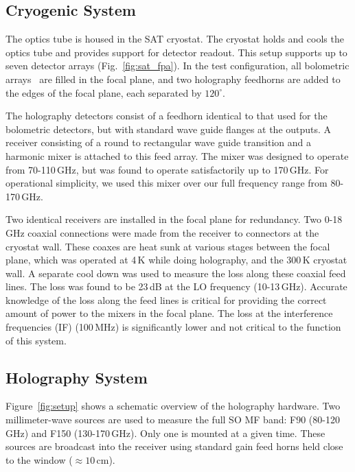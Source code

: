 \subsection{Cryogenic System}
\label{sec:sat_cryo_rec}
The optics tube is housed in the SAT cryostat\cite{2020SPIE11445E..7LK}.  The cryostat holds and cools the optics tube and provides support for detector readout.  This setup supports up to seven detector arrays (Fig.~\ref{fig:sat_fpa}).   In the test configuration, all bolometric arrays~\cite{2022arXiv220104507H} are filled in the focal plane, and two holography feedhorns are added to the edges of the focal plane, each separated by $120^{\circ}$.



The holography detectors consist of a feedhorn  identical to that used for the bolometric detectors, but with standard wave guide flanges at the outputs. A receiver consisting of a round to rectangular wave guide transition and a harmonic mixer is attached to this feed array.  The mixer was designed to operate from 70-110\,GHz, but was found to operate satisfactorily up to 170\,GHz. For operational simplicity, we used this mixer over our full frequency range from 80-170\,GHz.

Two identical receivers are installed in the focal plane for redundancy.  Two 0-18\,GHz coaxial connections were made from the receiver to connectors at the cryostat wall.  These coaxes are heat sunk at various stages between the focal plane, which was operated at 4\,K while doing holography, and the 300\,K cryostat wall.  A separate cool down was used to measure the loss along these coaxial feed lines.  The loss  was found to be 23\,dB at the LO frequency (10-13\,GHz).  Accurate knowledge of the loss along the feed lines is critical for providing the correct amount of power to the mixers in the focal plane.  The loss at the interference frequencies (IF) (100\,MHz) is significantly lower and not critical to the function of this system.

\subsection{Holography System}
\label{sec:sat_meas_hardware}

Figure~\ref{fig:setup} shows a schematic overview of the holography hardware.  Two millimeter-wave sources are used to measure the full SO MF band: F90 (80-120\,GHz) and F150 (130-170\,GHz).  Only one is mounted at a given time.  These sources are broadcast into the receiver using standard gain feed horns held close to the window ($\approx10$\,cm).

